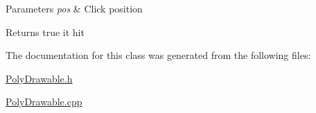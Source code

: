 \begin{DoxyParams}{Parameters}
{\em pos} & Click position \\
\hline
\end{DoxyParams}
\begin{DoxyReturn}{Returns}
true it hit 
\end{DoxyReturn}


The documentation for this class was generated from the following files\+:\begin{DoxyCompactItemize}
\item 
\hyperlink{_poly_drawable_8h}{Poly\+Drawable.\+h}\item 
\hyperlink{_poly_drawable_8cpp}{Poly\+Drawable.\+cpp}\end{DoxyCompactItemize}
